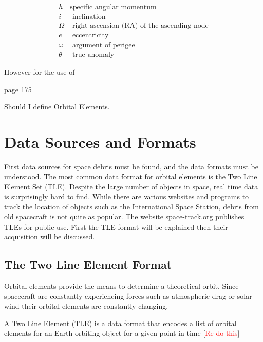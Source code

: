 \documentclass[12pt]{report}
\begin{document}
	\begin{eqnarray}
	h& \text{specific angular momentum}\\
	i& \text{ inclination}\\
	\Omega &\text{ right ascension (RA) of the ascending node}\\
	e & \text{ eccentricity}\\
	\omega &\text{ argument of perigee}\\
	\theta &\text{ true anomaly}
	\end{eqnarray}
	
	However for the use of
	
	
	page 175
	
	Should I define Orbital Elements.

	
	\newpage
	\section{Data Sources and Formats}
	
	
	
	First data sources for space debris must be found, and the data formats must be understood. The most common data format for orbital elements is the Two Line Element Set (TLE). Despite the large number of objects in space, real time data is surprisingly hard to find. While there are various websites and programs to track the location of objects such as the International Space Station, debris from old spacecraft is not quite as popular. The website space-track.org publishes TLEs for public use. First the TLE format will be explained then their acquisition will be discussed. 
	
	
	
	
	\subsection{The Two Line Element Format}
	
	Orbital elements provide the means to determine a theoretical orbit. Since spacecraft are constantly experiencing forces such as atmospheric drag or solar wind their orbital elements are constantly changing. \par 
	A Two Line Element (TLE) is a data format that encodes a list of orbital elements for an Earth-orbiting object for a given point in time [\textcolor{red}{Re do this}]\par
	
\end{document}
